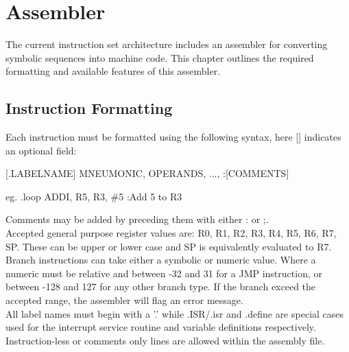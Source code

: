 
\section{Assembler}
The current instruction set architecture includes an assembler for converting symbolic sequences into machine code. This chapter outlines the required formatting and available features of this assembler. 

\subsection{Instruction Formatting}
Each instruction must be formatted using the following syntax, here [] indicates an optional field:

\begin{center}[.LABELNAME] MNEUMONIC, OPERANDS, ..., :[COMMENTS]\end{center}

\begin{center}eg. .loop ADDI, R5, R3, \#5 :Add 5 to R3\end{center}

\noindent Comments may be added by preceding them with either : or ;.\\

\noindent Accepted general purpose register values are: R0, R1, R2, R3, R4, R5, R6, R7, SP. These can be upper or lower case and SP is equivalently evaluated to R7.\\

\noindent Branch instructions can take either a symbolic or numeric value. Where a numeric must be relative and between -32 and 31 for a JMP instruction, or between -128 and 127 for any other branch type. If the branch exceed the accepted range, the assembler will flag an error message. \\

\noindent All label names must begin with a '.' while .ISR/.isr and .define are special cases used for the interrupt service routine and variable definitions respectively. \\

\noindent Instruction-less or comments only lines are allowed within the assembly file. \\
\newpage
{}

